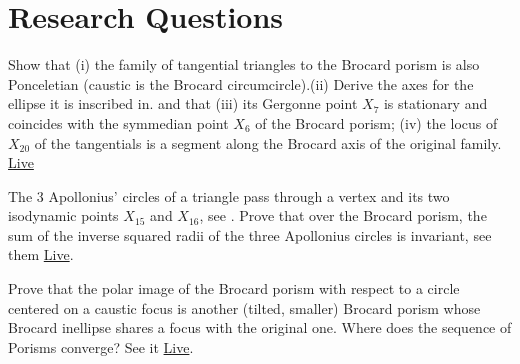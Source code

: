 \section{Research Questions}

\begin{question}
Show that (i) the family of tangential triangles to the Brocard porism is also Ponceletian (caustic is the Brocard circumcircle).(ii) Derive the axes for the ellipse it is inscribed in.  and that (iii) its Gergonne point $X_7$ is stationary and coincides with the symmedian point $X_6$ of the Brocard porism; (iv) the locus of $X_{20}$ of the tangentials is a segment along the Brocard axis of the original family. \href{https://bit.ly/2RpNxdn}{Live} 
\end{question}

\begin{question}
The 3 Apollonius' circles of a triangle pass through a vertex and its two isodynamic points $X_{15}$ and $X_{16}$, see \cite[Isodynamic points]{mw}. Prove that over the Brocard porism, the sum of the inverse squared radii of the three Apollonius circles is invariant, see them \href{https://bit.ly/3elEzXI}{Live}.
\end{question}

\begin{question}
Prove that the polar image of the Brocard porism with respect to a circle centered on a caustic focus is another (tilted, smaller) Brocard porism whose Brocard inellipse shares a focus with the original one. Where does the sequence of Porisms converge? See it \href{https://bit.ly/3b7erOg}{Live}.
\end{question}

